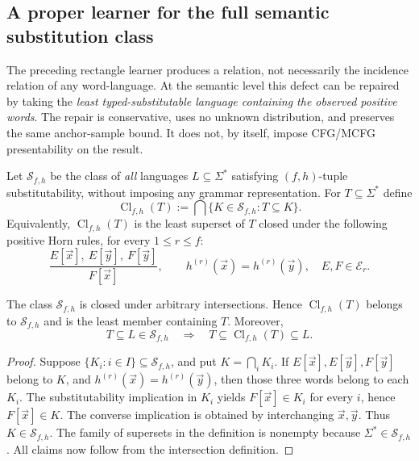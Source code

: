 
\subsection{A proper learner for the full semantic substitution class}
\label{subsec:direct-semantic-proper}

The preceding rectangle learner produces a relation, not necessarily the
incidence relation of any word-language.  At the semantic level this
defect can be repaired by taking the \emph{least typed-substitutable
language containing the observed positive words}.  The repair is
conservative, uses no unknown distribution, and preserves the same
anchor-sample bound.  It does not, by itself, impose CFG/MCFG
presentability on the result.

\begin{definition}
\label{def:semantic-horn}
Let \(\mathcal S_{f,h}\) be the class of \emph{all} languages
\(L\subseteq\Sigma^*\) satisfying \((f,h)\)-tuple
substitutability, without imposing any grammar representation.
For \(T\subseteq\Sigma^*\) define
\[
 \operatorname{Cl}_{f,h}(T)
 :=
 \bigcap\{K\in\mathcal S_{f,h}:T\subseteq K\}.
\]
Equivalently, \(\operatorname{Cl}_{f,h}(T)\) is the least
superset of \(T\) closed under the following positive Horn rules,
for every \(1\le r\le f\):
\[
 \frac{E[\vec x],\ E[\vec y],\ F[\vec y]}
      {F[\vec x]},
 \qquad
 h^{(r)}(\vec x)=h^{(r)}(\vec y),
 \quad E,F\in\mathcal E_r.
\]
\end{definition}

\begin{lemma}
\label{lem:semantic-horn}
The class \(\mathcal S_{f,h}\) is closed under arbitrary
intersections.  Hence \(\operatorname{Cl}_{f,h}(T)\) belongs
to \(\mathcal S_{f,h}\) and is the least member containing \(T\).
Moreover,
\[
 T\subseteq L\in\mathcal S_{f,h}
 \quad\Longrightarrow\quad
 T\subseteq\operatorname{Cl}_{f,h}(T)\subseteq L.
\]
\end{lemma}
\begin{proof}
Suppose \(\{K_i:i\in I\}\subseteq\mathcal S_{f,h}\), and
put \(K=\bigcap_iK_i\).  If \(E[\vec x],E[\vec y],F[\vec y]\)
belong to \(K\), and \(h^{(r)}(\vec x)=h^{(r)}(\vec y)\),
then those three words belong to each \(K_i\).  The
substitutability implication in \(K_i\) yields
\(F[\vec x]\in K_i\) for every \(i\), hence
\(F[\vec x]\in K\).  The converse implication is obtained
by interchanging \(\vec x,\vec y\).  Thus \(K\in\mathcal
S_{f,h}\).  The family of supersets in the definition is
nonempty because \(\Sigma^*\in\mathcal S_{f,h}\).
All claims now follow from the intersection definition.
\end{proof}

